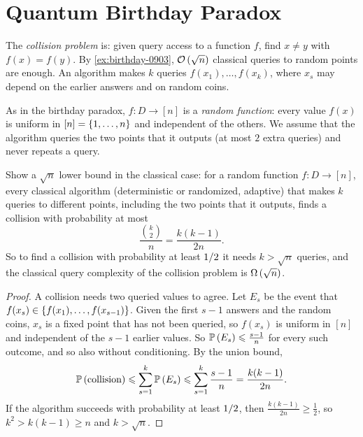 \section{Quantum Birthday Paradox}

The \emph{collision problem} is: given query access to a function $f$, find $x \neq y$ with
$f(x) = f(y)$. By \cref{ex:birthday-0903}, $\mathcal{O}\left(\sqrt{n}\right)$ classical queries to random points
are enough. An algorithm makes $k$ queries $f(x_1), \dots, f(x_k)$, where $x_s$ may depend on the
earlier answers and on random coins.

As in the birthday paradox, $f \colon D \to [n]$ is a \emph{random function}: every value $f(x)$ is
uniform in $[n] = \left\lbrace1, \dots, n\right\rbrace$ and independent of the others. We assume that the algorithm
queries the two points that it outputs (at most $2$ extra queries) and never repeats a query.

\begin{exercisebox}
\begin{exercise}\label{ex:collision-lb-0903}\label{thm:collision-lb-0903}
    Show a $\sqrt{n}$ lower bound in the classical case: for a random function
    $f \colon D \to [n]$, every classical algorithm (deterministic or randomized, adaptive) that
    makes $k$ queries to different points, including the two points that it outputs, finds a
    collision with probability at most
    \[\frac{\binom{k}{2}}{n} = \frac{k(k-1)}{2n}.\]
    So to find a collision with probability at least $1/2$ it needs $k > \sqrt{n}$
    queries, and the classical query complexity of the collision problem is $\Omega\left(\sqrt{n}\right)$.
\end{exercise}
\tcblower
\begin{proof}
    A collision needs two queried values to agree. Let $E_s$ be the event that
    $f(x_s) \in \left\lbrace f(x_1), \dots, f(x_{s-1})\right\rbrace$. Given the first $s-1$ answers and the random
    coins, $x_s$ is a fixed point that has not been queried, so $f(x_s)$ is uniform in $[n]$ and
    independent of the $s-1$ earlier values. So $\operatorname{\mathbb{P}}\left(E_s\right) \leqslant \frac{s-1}{n}$ for every such
    outcome, and so also without conditioning. By the union bound,
    \[\operatorname{\mathbb{P}}\left(\text{collision}\right) \leqslant \sum_{s=1}^{k} \operatorname{\mathbb{P}}\left(E_s\right) \leqslant \sum_{s=1}^{k} \frac{s-1}{n} = \frac{k(k-1)}{2n}.\]
    If the algorithm succeeds with probability at least $1/2$, then
    $\frac{k(k-1)}{2n} \geq \frac{1}{2}$, so $k^2 > k(k-1) \geq n$ and $k > \sqrt{n}$.
\end{proof}
\end{exercisebox}
